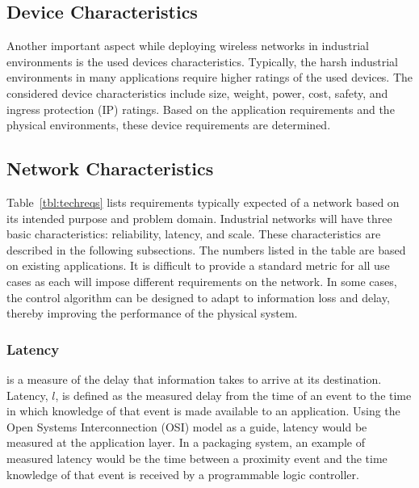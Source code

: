     \subsection{Device Characteristics}  
Another important aspect while deploying wireless networks in industrial environments is the used devices characteristics. Typically, the harsh industrial environments in many applications require higher ratings of the used devices. The considered device characteristics include size, weight, power, cost, safety, and ingress protection (IP) ratings. Based on the application requirements and the physical environments, these device requirements are determined.



    
    \subsection{Network Characteristics}
    
Table~\ref{tbl:techreqs} lists requirements typically expected of a network based on its intended purpose and problem domain.  Industrial networks will have three basic characteristics: reliability, latency, and scale.  These characteristics are described in the following subsections.  The numbers listed in the table are based on existing applications.  It is difficult to provide a standard metric for all use cases as each will impose different requirements on the network.  In some cases, the control algorithm can be designed to adapt to information loss and delay, thereby improving the performance of the physical system.

	\subsubsection{Latency} is a measure of the delay that information takes to arrive at its destination.  Latency, $l$, is defined as the measured delay from the time of an event to the time in which knowledge of that event is made available to an application. Using the Open Systems Interconnection (OSI) model as a guide, latency would be measured at the application layer.  In a packaging system, an example of measured latency would be the time between a proximity event and the time knowledge of that event is received by a programmable logic controller. 
    
